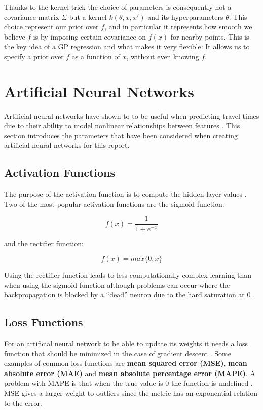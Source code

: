 Thanks to the kernel trick the choice of parameters is consequently not a covariance matrix $\Sigma$ but a kernel $k(\theta, x, x')$ and its hyperparameters $\theta$. This choice represent our prior over $f$, and in particular it represents how smooth we believe $f$ is by imposing certain covariance on $f(x)$ for nearby points. This is the key idea of a GP regression and what makes it very flexible: It allows us to specify a prior over $f$ as a function of $x$, without even knowing $f$. \cite{Bishop-2006} \cite{Rasmussen-Williams-2006}

\section{Artificial Neural Networks}
Artificial neural networks have shown to to be useful when predicting travel times due to their ability to model nonlinear relationships between features \cite{brazilANN}\cite{malaysiaANN}. This section introduces the parameters that have been considered when creating artificial neural networks for this report.

\subsection{Activation Functions}
The purpose of the activation function is to compute the hidden layer values \cite{Goodfellow-et-al-2016}. Two of the most popular activation functions are the sigmoid function:

\begin{equation} 
	f(x) = \frac{1}{1+e^{-x}} 
\end{equation}

and the rectifier function:

\begin{equation} 
	f(x) = max\{0,x\}
\end{equation}

Using the rectifier function leads to less computationally complex learning than when using the sigmoid function although problems can occur where the backpropagation is blocked by a ``dead'' neuron due to the hard saturation at 0 \cite{pmlr-v15-glorot11a}.

 \subsection{Loss Functions}
For an artificial neural network to be able to update its weights it needs a loss function that should be minimized in the case of gradient descent \cite{Goodfellow-et-al-2016}. Some examples of common loss functions are \textbf{mean squared error (MSE)}, \textbf{mean absolute error (MAE)} and \textbf{mean absolute percentage error (MAPE)}. A problem with MAPE is that when the true value is 0 the function is undefined \cite{MAPE}. MSE gives a larger weight to outliers since the metric has an exponential relation to the error.

